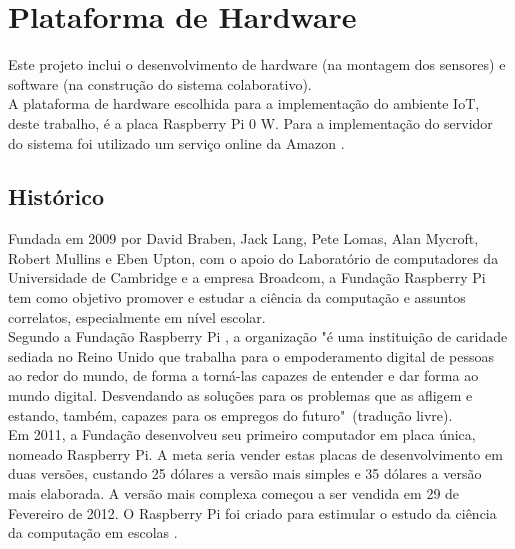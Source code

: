 \section{Plataforma de Hardware}
\label{sec:plataforma}
\quad Este projeto inclui o desenvolvimento de hardware (na montagem dos sensores) e software (na construção do sistema colaborativo).
\\\null\quad A plataforma de hardware escolhida para a implementação do ambiente \acrlong{IoT}, deste trabalho, é a placa Raspberry Pi 0 W. Para a implementação do servidor do sistema foi utilizado um serviço online da Amazon \cite{lightsail}.
\subsection{Histórico}
\quad Fundada em 2009 por David Braben, Jack Lang, Pete Lomas, Alan Mycroft, Robert Mullins e Eben Upton, com o apoio do Laboratório de computadores da Universidade de Cambridge e a empresa Broadcom, a Fundação Raspberry Pi tem como objetivo promover e estudar a ciência da computação e assuntos correlatos, especialmente em nível escolar.
\\\null\quad Segundo a Fundação Raspberry Pi \cite{rasp}, a organização "é uma instituição de caridade sediada no Reino Unido que trabalha para o empoderamento digital de pessoas ao redor do mundo,
de forma a torná-las capazes de entender e dar forma ao mundo digital. Desvendando as soluções para os
problemas que as afligem e estando, também, capazes para os empregos do futuro"\ (tradução livre).
\\\null \quad Em 2011, a Fundação desenvolveu seu primeiro computador em placa única, nomeado Raspberry Pi. A meta seria vender estas placas
de desenvolvimento em duas versões, custando 25 dólares a versão mais simples e 35 dólares a versão mais elaborada. A versão mais complexa começou a ser vendida
em 29 de Fevereiro de 2012. O Raspberry Pi foi criado para estimular o estudo da ciência da computação em escolas \cite{rasp}.
